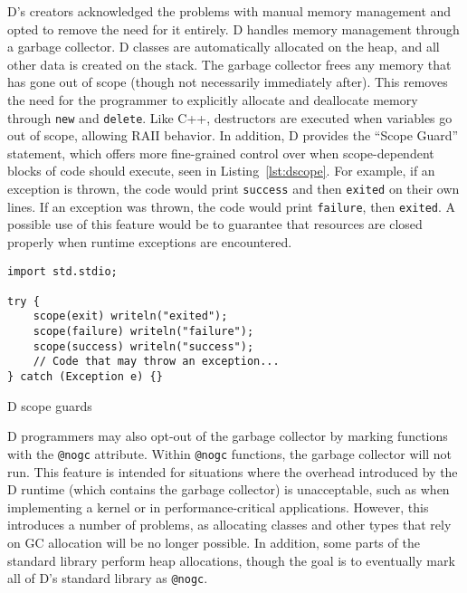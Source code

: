 \documentclass[finalcopy]{srpaper}
\begin{document}
D's creators acknowledged the problems with manual memory management and opted
to remove the need for it entirely. D handles memory management through a
garbage collector. D classes are automatically allocated on the heap, and all
other data is created on the stack. The garbage collector frees any memory that
has gone out of scope (though not necessarily immediately after). This removes
the need for the programmer to explicitly allocate and deallocate memory
through \texttt{new} and \texttt{delete}. Like C++, destructors are executed
when variables go out of scope, allowing RAII behavior. In addition, D provides
the ``Scope Guard'' statement, which offers more fine-grained control over when
scope-dependent blocks of code should execute, seen in
Listing~\ref{lst:dscope}. For example, if an exception is thrown, the code
would print \texttt{success} and then \texttt{exited} on their own lines. If an
exception was thrown, the code would print \texttt{failure}, then
\texttt{exited}. A possible use of this feature would be to guarantee that
resources are closed properly when runtime exceptions are encountered.

\begin{listing}[H]
\begin{verbatim}
import std.stdio;

try {
    scope(exit) writeln("exited");
    scope(failure) writeln("failure");
    scope(success) writeln("success");
    // Code that may throw an exception...
} catch (Exception e) {}
\end{verbatim}
\caption{D scope guards}
\label{lst:dscope}
\end{listing}

D programmers may also opt-out of the garbage collector by marking functions
with the \texttt{@nogc} attribute. Within \texttt{@nogc} functions, the garbage
collector will not run. This feature is intended for situations where the
overhead introduced by the D runtime (which contains the garbage collector) is
unacceptable, such as when implementing a kernel or in performance-critical
applications. However, this introduces a number of problems, as allocating
classes and other types that rely on GC allocation will be no longer possible.
In addition, some parts of the standard library perform heap allocations,
though the goal is to eventually mark all of D's standard library as
\texttt{@nogc}.
\end{document}
